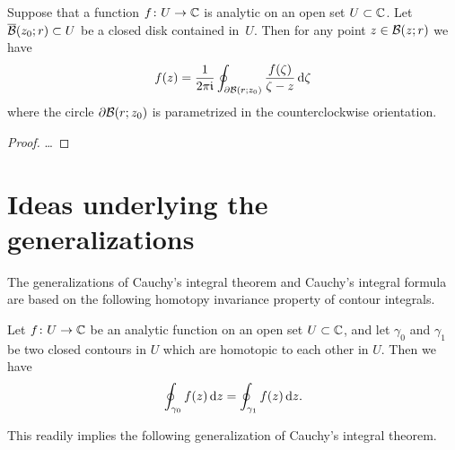 \begin{corollary}
  \label{cor:cauchy_formula_circle}
  Suppose that a function $f \colon U \to \bC$ is analytic on an open
  set $U \subset \bC$.
  Let $\CDiskRC{r}{z_0} \subset U$ be a closed disk contained in~$U$.
  Then for any point $z \in \DiskRC{r}{z}$ we have
  \begin{align*}
    f(z) = \frac{1}{2\pi \ii}
        \oint_{\bdry \DiskRC{z_0}{r}} \frac{f(\zeta)}{\zeta - z} \, \ud \zeta
  \end{align*}
  where the circle $\bdry \DiskRC{z_0}{r}$ is parametrized in the
  counterclockwise orientation.
\end{corollary}
\begin{proof}
  \ldots
\end{proof}



\section{Ideas underlying the generalizations}

The generalizations of Cauchy's integral theorem and Cauchy's integral
formula are based on the following homotopy invariance property of
contour integrals.

\begin{lemma}
  \label{lem:homotopy_invariance}
  Let $f \colon U \to \bC$ be an analytic function on an open
  set $U \subset \bC$, and let $\gamma_0$ and $\gamma_1$ be two
  closed contours in $U$ which are homotopic to each other in $U$.
  Then we have
  \begin{align*}
    \oint_{\gamma_0} f(z) \, \ud z = \oint_{\gamma_1} f(z) \, \ud z .
  \end{align*}
\end{lemma}

This readily implies the following generalization of Cauchy's integral
theorem.

